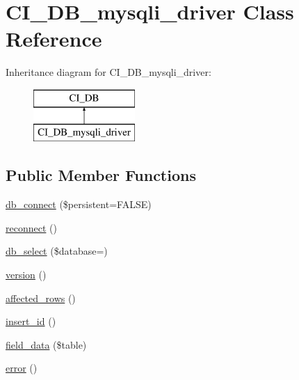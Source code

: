 \hypertarget{class_c_i___d_b__mysqli__driver}{}\section{C\+I\+\_\+\+D\+B\+\_\+mysqli\+\_\+driver Class Reference}
\label{class_c_i___d_b__mysqli__driver}
Inheritance diagram for C\+I\+\_\+\+D\+B\+\_\+mysqli\+\_\+driver\+:\begin{figure}[H]
\begin{center}
\leavevmode
\includegraphics[height=2.000000cm]{class_c_i___d_b__mysqli__driver}
\end{center}
\end{figure}
\subsection*{Public Member Functions}
\begin{DoxyCompactItemize}
\item 
\mbox{\hyperlink{class_c_i___d_b__mysqli__driver_a52bf595e79e96cc0a7c907a9b45aeb4d}{db\+\_\+connect}} (\$persistent=F\+A\+L\+SE)
\item 
\mbox{\hyperlink{class_c_i___d_b__mysqli__driver_a57c19c642ab3023e28d10c50f86ff0a8}{reconnect}} ()
\item 
\mbox{\hyperlink{class_c_i___d_b__mysqli__driver_a18ae9c21870b30b45337c5e3626190cc}{db\+\_\+select}} (\$database=\textquotesingle{}\textquotesingle{})
\item 
\mbox{\hyperlink{class_c_i___d_b__mysqli__driver_a6080dae0886626b9a4cedb29240708b1}{version}} ()
\item 
\mbox{\hyperlink{class_c_i___d_b__mysqli__driver_a77248aaad33eb132c04cc4aa3f4bc8cb}{affected\+\_\+rows}} ()
\item 
\mbox{\hyperlink{class_c_i___d_b__mysqli__driver_a933f2cde8dc7f87875e257d0a4902e99}{insert\+\_\+id}} ()
\item 
\mbox{\hyperlink{class_c_i___d_b__mysqli__driver_a90355121e1ed009e0efdbd544ab56efa}{field\+\_\+data}} (\$table)
\item 
\mbox{\hyperlink{class_c_i___d_b__mysqli__driver_a43b8d30b879d4f09ceb059b02af2bc02}{error}} ()
\end{DoxyCompactItemize}
